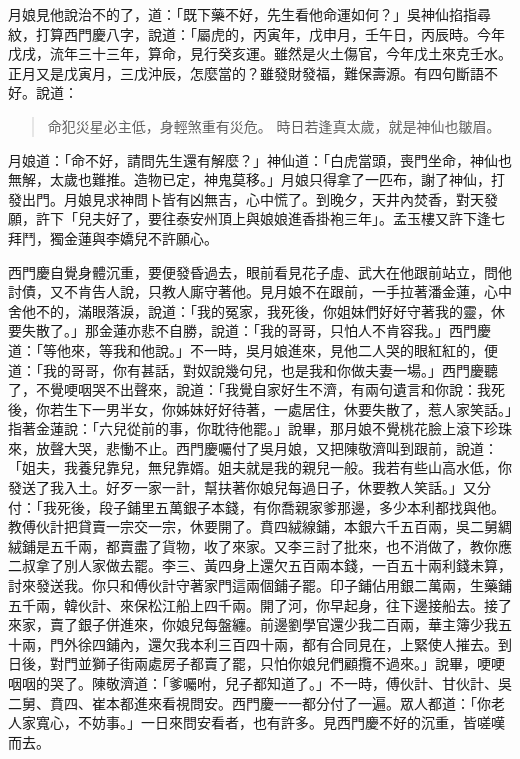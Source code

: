 月娘見他說治不的了，道：「既下藥不好，先生看他命運如何？」吳神仙掐指尋紋，打算西門慶八字，說道：「屬虎的，丙寅年，戊申月，壬午日，丙辰時。今年戊戌，流年三十三年，算命，見行癸亥運。雖然是火土傷官，今年戊土來克壬水。正月又是戊寅月，三戊沖辰，怎麼當的？雖發財發福，難保壽源。有四句斷語不好。說道：
\begin{quote}
命犯災星必主低，身輕煞重有災危。
時日若逢真太歲，就是神仙也皺眉。
\end{quote}

月娘道：「命不好，請問先生還有解麼？」神仙道：「白虎當頭，喪門坐命，神仙也無解，太歲也難推。造物已定，神鬼莫移。」月娘只得拿了一匹布，謝了神仙，打發出門。月娘見求神問卜皆有凶無吉，心中慌了。到晚夕，天井內焚香，對天發願，許下「兒夫好了，要往泰安州頂上與娘娘進香掛袍三年」。孟玉樓又許下逢七拜鬥，獨金蓮與李嬌兒不許願心。

西門慶自覺身體沉重，要便發昏過去，眼前看見花子虛、武大在他跟前站立，問他討債，又不肯告人說，只教人廝守著他。見月娘不在跟前，一手拉著潘金蓮，心中舍他不的，滿眼落淚，說道：「我的冤家，我死後，你姐妹們好好守著我的靈，休要失散了。」那金蓮亦悲不自勝，說道：「我的哥哥，只怕人不肯容我。」西門慶道：「等他來，等我和他說。」不一時，吳月娘進來，見他二人哭的眼紅紅的，便道：「我的哥哥，你有甚話，對奴說幾句兒，也是我和你做夫妻一場。」西門慶聽了，不覺哽咽哭不出聲來，說道：「我覺自家好生不濟，有兩句遺言和你說：我死後，你若生下一男半女，你姊妹好好待著，一處居住，休要失散了，惹人家笑話。」指著金蓮說：「六兒從前的事，你耽待他罷。」說畢，那月娘不覺桃花臉上滾下珍珠來，放聲大哭，悲慟不止。西門慶囑付了吳月娘，又把陳敬濟叫到跟前，說道：「姐夫，我養兒靠兒，無兒靠婿。姐夫就是我的親兒一般。我若有些山高水低，你發送了我入土。好歹一家一計，幫扶著你娘兒每過日子，休要教人笑話。」又分付：「我死後，段子鋪里五萬銀子本錢，有你喬親家爹那邊，多少本利都找與他。教傅伙計把貸賣一宗交一宗，休要開了。賁四絨線鋪，本銀六千五百兩，吳二舅綢絨鋪是五千兩，都賣盡了貨物，收了來家。又李三討了批來，也不消做了，教你應二叔拿了別人家做去罷。李三、黃四身上還欠五百兩本錢，一百五十兩利錢未算，討來發送我。你只和傅伙計守著家門這兩個鋪子罷。印子鋪佔用銀二萬兩，生藥鋪五千兩，韓伙計、來保松江船上四千兩。開了河，你早起身，往下邊接船去。接了來家，賣了銀子併進來，你娘兒每盤纏。前邊劉學官還少我二百兩，華主簿少我五十兩，門外徐四鋪內，還欠我本利三百四十兩，都有合同見在，上緊使人摧去。到日後，對門並獅子街兩處房子都賣了罷，只怕你娘兒們顧攬不過來。」說畢，哽哽咽咽的哭了。陳敬濟道：「爹囑咐，兒子都知道了。」不一時，傅伙計、甘伙計、吳二舅、賁四、崔本都進來看視問安。西門慶一一都分付了一遍。眾人都道：「你老人家寬心，不妨事。」一日來問安看者，也有許多。見西門慶不好的沉重，皆嗟嘆而去。

